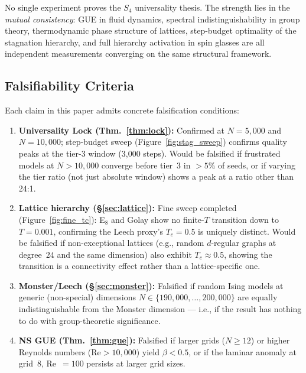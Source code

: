 \documentclass[11pt,a4paper]{article}
\begin{document}
No single experiment proves the $S_4$ universality thesis.
The strength lies in the \emph{mutual consistency}: GUE in fluid dynamics, spectral indistinguishability in group theory, thermodynamic phase structure of lattices, step-budget optimality of the stagnation hierarchy, and full hierarchy activation in spin glasses are all independent measurements converging on the same structural framework.

\subsection{Falsifiability Criteria}\label{sec:falsify}

Each claim in this paper admits concrete falsification conditions:

\begin{enumerate}[nosep]
\item \textbf{Universality Lock (Thm.~\ref{thm:lock}):} Confirmed at $N = 5{,}000$ and $N = 10{,}000$; step-budget sweep (Figure~\ref{fig:stag_sweep}) confirms quality peaks at the tier-3 window (3{,}000 steps). Would be falsified if frustrated models at $N > 10{,}000$ converge before tier~3 in $> 5\%$ of seeds, or if varying the tier ratio (not just absolute window) shows a peak at a ratio other than 24:1.

\item \textbf{Lattice hierarchy (\S\ref{sec:lattice}):} Fine sweep completed (Figure~\ref{fig:fine_tc}): E$_8$ and Golay show no finite-$T$ transition down to $T = 0.001$, confirming the Leech proxy's $T_c = 0.5$ is uniquely distinct. Would be falsified if non-exceptional lattices (e.g., random $d$-regular graphs at degree~$24$ and the same dimension) also exhibit $T_c \approx 0.5$, showing the transition is a connectivity effect rather than a lattice-specific one.

\item \textbf{Monster/Leech (\S\ref{sec:monster}):} Falsified if random Ising models at generic (non-special) dimensions $N \in \{190{,}000, \ldots, 200{,}000\}$ are equally indistinguishable from the Monster dimension --- i.e., if the result has nothing to do with group-theoretic significance.

\item \textbf{NS GUE (Thm.~\ref{thm:gue}):} Falsified if larger grids ($N \geq 12$) or higher Reynolds numbers ($\mathrm{Re} > 10{,}000$) yield $\beta < 0.5$, or if the laminar anomaly at grid~$8$, Re~$= 100$ persists at larger grid sizes.

\end{enumerate}
\end{document}
